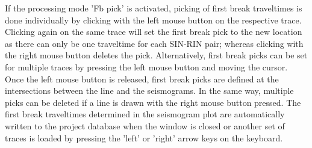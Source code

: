 \documentclass[a4paper,fleqn]{cas-sc}
\begin{document}
If the processing mode 'Fb pick' is activated, picking of first break traveltimes is done individually by clicking with the left mouse button on the respective trace. Clicking again on the same trace will set the first break pick to the new location as there can only be one traveltime for each SIN-RIN pair; whereas clicking with the right mouse button deletes the pick. Alternatively, first break picks can be set for multiple traces by pressing the left mouse button and moving the cursor. 
Once the left mouse button is released, first break picks are defined at the intersections between the line and the seismograms. In the same way, multiple picks can be deleted if a line is drawn with the right mouse button pressed. The first break traveltimes determined in the seismogram plot are automatically written to the project database when the window is closed or another set of traces is loaded by pressing the 'left' or 'right' arrow keys on the keyboard. 
\end{document}
